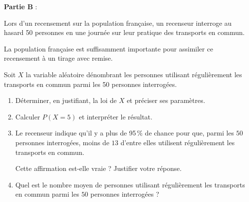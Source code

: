 \textbf{Partie B} :

\medskip

Lors d'un recensement sur la population française, un recenseur interroge au hasard 50 personnes en une journée sur leur pratique des transports en commun. 

La population française est suffisamment importante pour assimiler ce recensement à un tirage avec remise.

Soit $X$ la variable aléatoire dénombrant les personnes utilisant régulièrement les transports en commun parmi les 50 personnes interrogées.

\medskip

\begin{enumerate}
\item Déterminer, en justifiant, la loi de $X$ et préciser ses paramètres.
\item Calculer $P(X = 5)$ et interpréter le résultat.
\item Le recenseur indique qu'il y a plus de 95\,\% de chance pour que, parmi les $50$ personnes interrogées, moins de $13$ d'entre elles utilisent régulièrement les transports en commun.

Cette affirmation est-elle vraie ? Justifier votre réponse.
\item Quel est le nombre moyen de personnes utilisant régulièrement les transports en commun parmi les $50$ personnes interrogées ?
\end{enumerate}

\bigskip

